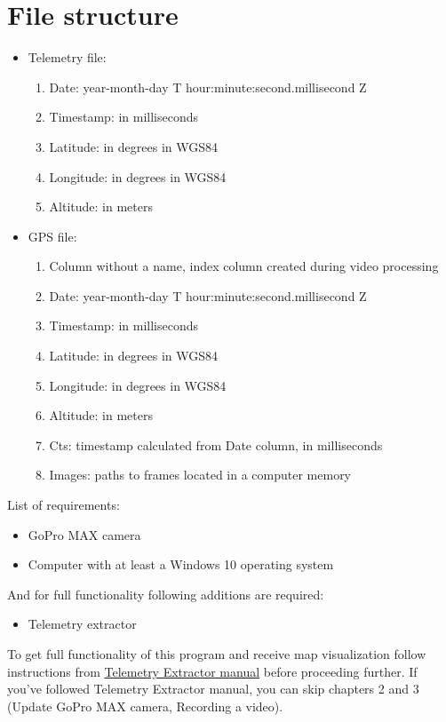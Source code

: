\documentclass[a4paper,12pt]{book}
\begin{document}
\section{File structure}
\begin{itemize}
	\item Telemetry file:
	\begin{enumerate}
		\item Date: year-month-day T hour:minute:second.millisecond Z
		\item Timestamp: in milliseconds
		\item Latitude: in degrees in WGS84
		\item Longitude: in degrees in WGS84
		\item Altitude: in meters
	\end{enumerate}
	
	\item GPS file:
	\begin{enumerate}
		\item Column without a name, index column created during video processing
		\item Date: year-month-day T hour:minute:second.millisecond Z
		\item Timestamp: in milliseconds
		\item Latitude: in degrees in WGS84
		\item Longitude: in degrees in WGS84
		\item Altitude: in meters
		\item Cts: timestamp calculated from Date column, in milliseconds
		\item Images: paths to frames located in a computer memory
	\end{enumerate}
\end{itemize}

\pagebreak
List of requirements:
\begin{itemize}
	\item GoPro MAX camera
	\item Computer with at least a Windows 10 operating system
\end{itemize}
And for full functionality following additions are required:
\begin{itemize}
	\item Telemetry extractor
\end{itemize}
To get full functionality of this program and receive map visualization follow instructions from \href{https://github.com/miloszwojciechowski/Open-vslam-project/tree/main/Manuals/Telemetry_extractor}{Telemetry Extractor manual} before proceeding further. If you've followed Telemetry Extractor manual, you can skip chapters 2 and 3 (Update GoPro MAX camera, Recording a video).
\end{document}
